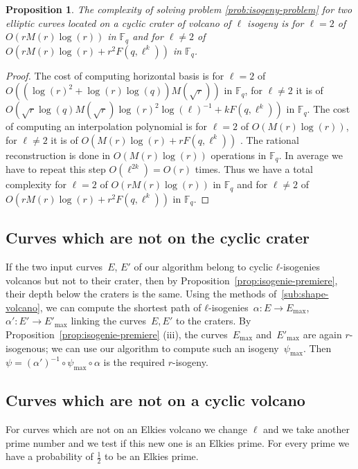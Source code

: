 \documentclass{lms}
\newtheorem{prop}[thm]{Proposition}
\begin{document}
\begin{prop}
The complexity of solving problem \ref{prob:isogeny-problem} for two elliptic curves located on a cyclic crater of volcano of $\ell$ isogeny is for $\ell=2$ of $O(rM(r)\log(r))$ in $\mathbb{F}_q$ and for $\ell \neq 2$ of $O(rM(r)\log(r)+r^2F(q,\ell^k))$ in $\mathbb{F}_q$.
\end{prop}

\begin{proof}
The cost of computing horizontal basis is for $\ell=2$ of $O((\log(r)^2+\log(r)\log(q))M(\sqrt{r}))$ in $\mathbb{F}_q$, for $\ell \neq 2$ it is of $O(\sqrt{r}\log(q)M(\sqrt{r})\log(r)^2 \log(\ell)^{-1}+kF(q,\ell^k))$ in $\mathbb{F}_q$.
The cost of computing an interpolation polynomial is for $\ell=2$ of $O(M(r)\log(r))$, for $\ell \neq 2$ it is of $O(M(r)\log(r)+rF(q,\ell^k))$ . The rational reconstruction is done in $O(M(r)\log(r))$ operations in $\mathbb{F}_q$. In average we have to repeat this step $O(\ell^{2k})=O(r)$ times. 
Thus we have a total complexity for $\ell=2$ of  $O(rM(r)\log(r))$ in $\mathbb{F}_q$ and for $\ell \neq 2$ of $O(rM(r)\log(r)+r^2F(q,\ell^k))$ in $\mathbb{F}_q$.
\end{proof}
  
  \subsection{Curves which are not on the cyclic crater}

If the two input curves~$E$, $E'$ of our algorithm
belong to cyclic $ℓ$-isogenies volcanos but not to their crater,
then by Proposition~\ref{prop:isogenie-premiere},
their depth below the craters is the same.
Using the methods of~\ref{sub:shape-volcano},
we can compute the shortest path of $ℓ$-isogenies~$α: E → E_{\max}$,
$α': E' → E'_{\max}$ linking the curves~$E, E'$ to the craters.
By Proposition~\ref{prop:isogenie-premiere} (iii),
the curves~$E_{\max}$ and~$E'_{\max}$ are again $r$-isogenous;
we can use our algorithm to compute such an isogeny~$ψ_{\max}$.
Then $ψ = (α')^{-1} ∘ ψ_{\max} ∘ α$ is the required $r$-isogeny.

  \subsection{Curves which are not on a cyclic volcano}
  For curves which are not on an Elkies volcano we change $\ell$ and we take another prime number and we test if this new one is an Elkies prime. For every prime we have a probability of $\frac{1}{2}$ to be an Elkies prime. 
\end{document}
